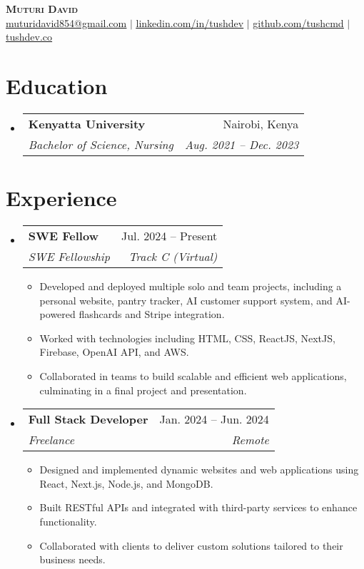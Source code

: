 \documentclass[letterpaper,11pt]{article}
\makeatletter
\newcommand{\resumeSubheading}[4]{
  \vspace{-2pt}\item
    \begin{tabular*}{\textwidth}{l@{\extracolsep{\fill}}r}
      \textbf{#1} & #2 \\
      \textit{\small#3} & \textit{\small #4} \\
    \end{tabular*}\vspace{-7pt}
}
\newcommand{\resumeSubItem}[1]{\item\small{#1 \vspace{-2pt}}}
\newcommand{\resumeSubHeadingListStart}{\begin{itemize}[leftmargin=0.15in, label={}]}
\newcommand{\resumeSubHeadingListEnd}{\end{itemize}}
\newcommand{\resumeItemListStart}{\begin{itemize}}
\newcommand{\resumeItemListEnd}{\end{itemize}\vspace{-5pt}}
\makeatother
\begin{document}
\begin{center}
    \textbf{\Huge \scshape Muturi David} \\ \vspace{1pt} 
    \href{mailto:muturidavid854@gmail.com}
    {\underline{muturidavid854@gmail.com}} $|$
    \href{https://linkedin.com/in/tushdev}{\underline{linkedin.com/in/tushdev}} $|$
    \href{https://github.com/tushcmd}{\underline{github.com/tushcmd}} $|$
    \href{https://tushdev.co/}{\underline{tushdev.co}}
\end{center}

\section{Education}
  \resumeSubHeadingListStart
    \resumeSubheading
      {Kenyatta University}{Nairobi, Kenya}
      {Bachelor of Science, Nursing}{Aug. 2021 -- Dec. 2023}
  \resumeSubHeadingListEnd

\section{Experience}
  \resumeSubHeadingListStart

    \resumeSubheading
      {SWE Fellow}{Jul. 2024 -- Present}
      {SWE Fellowship}{Track C (Virtual)}
      \resumeItemListStart
        \resumeSubItem{Developed and deployed multiple solo and team projects, including a personal website, pantry tracker, AI customer support system, and AI-powered flashcards and Stripe integration.}
        \resumeSubItem{Worked with technologies including HTML, CSS, ReactJS, NextJS, Firebase, OpenAI API, and AWS.}
        \resumeSubItem{Collaborated in teams to build scalable and efficient web applications, culminating in a final project and presentation.}
      \resumeItemListEnd
      
    \resumeSubheading
      {Full Stack Developer}{Jan. 2024 -- Jun. 2024}
      {Freelance}{Remote}
      \resumeItemListStart
        \resumeSubItem{Designed and implemented dynamic websites and web applications using React, Next.js, Node.js, and MongoDB.}
        \resumeSubItem{Built RESTful APIs and integrated with third-party services to enhance functionality.}
        \resumeSubItem{Collaborated with clients to deliver custom solutions tailored to their business needs.}
      \resumeItemListEnd

  \resumeSubHeadingListEnd
\end{document}

